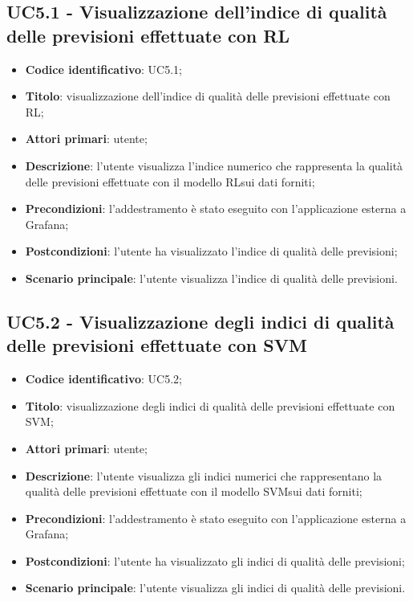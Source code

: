 \subsection{UC5.1 - Visualizzazione dell'indice di qualità delle previsioni effettuate con RL}
\begin{itemize}
	\item \textbf{Codice identificativo}: UC5.1;
	\item \textbf{Titolo}: visualizzazione dell'indice di qualità delle previsioni effettuate con RL\glo;
	\item \textbf{Attori primari}: utente;
	\item \textbf{Descrizione}: l'utente visualizza l'indice numerico che rappresenta la qualità delle previsioni effettuate con il modello RL\glosp sui dati forniti;
	\item \textbf{Precondizioni}: l'addestramento è stato eseguito con l'applicazione esterna a Grafana\glo;
	\item \textbf{Postcondizioni}: l'utente ha visualizzato l'indice di qualità delle previsioni;
	\item \textbf{Scenario principale}: l'utente visualizza l'indice di qualità delle previsioni.
\end{itemize} 
\subsection{UC5.2 - Visualizzazione degli indici di qualità delle previsioni effettuate con SVM}
\begin{itemize}
	\item \textbf{Codice identificativo}: UC5.2;
	\item \textbf{Titolo}: visualizzazione degli indici di qualità delle previsioni effettuate con SVM\glo;
	\item \textbf{Attori primari}: utente;
	\item \textbf{Descrizione}: l'utente visualizza gli indici numerici che rappresentano la qualità delle previsioni effettuate con il modello SVM\glosp sui dati forniti;
	\item \textbf{Precondizioni}: l'addestramento è stato eseguito con l'applicazione esterna a Grafana\glo;
	\item \textbf{Postcondizioni}: l'utente ha visualizzato gli indici di qualità delle previsioni;
	\item \textbf{Scenario principale}: l'utente visualizza gli indici di qualità delle previsioni.
\end{itemize} 
